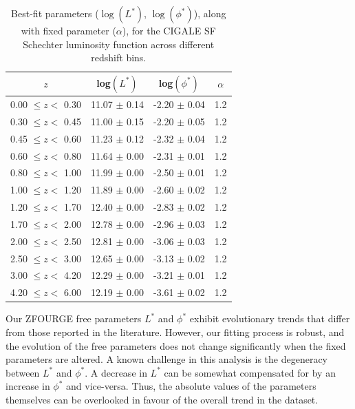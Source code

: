 \begin{table}[h]
    \caption{Best-fit parameters ($\log(L^*)$, $\log(\phi^*)$), along with fixed parameter ($\alpha$), for the CIGALE SF Schechter luminosity function across different redshift bins.}
    \label{Tab: Param Evo SF}
    \begin{center}
    \begin{tabular}{cccc}
        \toprule
        $z$ & log$(L^{*})$ & log$(\phi^{*})$ & $\alpha$ \\
        \hline
        0.00 $\leq z <$ 0.30 & 11.07 $\pm$ 0.14 & -2.20 $\pm$ 0.04 & 1.2 \\
        0.30 $\leq z <$ 0.45 & 11.00 $\pm$ 0.15 & -2.20 $\pm$ 0.05 & 1.2 \\
        0.45 $\leq z <$ 0.60 & 11.23 $\pm$ 0.12 & -2.32 $\pm$ 0.04 & 1.2 \\
        0.60 $\leq z <$ 0.80 & 11.64 $\pm$ 0.00 & -2.31 $\pm$ 0.01 & 1.2 \\
        0.80 $\leq z <$ 1.00 & 11.99 $\pm$ 0.00 & -2.50 $\pm$ 0.01 & 1.2 \\
        1.00 $\leq z <$ 1.20 & 11.89 $\pm$ 0.00 & -2.60 $\pm$ 0.02 & 1.2 \\
        1.20 $\leq z <$ 1.70 & 12.40 $\pm$ 0.00 & -2.83 $\pm$ 0.02 & 1.2 \\
        1.70 $\leq z <$ 2.00 & 12.78 $\pm$ 0.00 & -2.96 $\pm$ 0.03 & 1.2 \\
        2.00 $\leq z <$ 2.50 & 12.81 $\pm$ 0.00 & -3.06 $\pm$ 0.03 & 1.2 \\
        2.50 $\leq z <$ 3.00 & 12.65 $\pm$ 0.00 & -3.13 $\pm$ 0.02 & 1.2 \\
        3.00 $\leq z <$ 4.20 & 12.29 $\pm$ 0.00 & -3.21 $\pm$ 0.01 & 1.2 \\
        4.20 $\leq z <$ 6.00 & 12.19 $\pm$ 0.00 & -3.61 $\pm$ 0.02 & 1.2      
        \botrule
    \end{tabular}
    \end{center}
\end{table}

Our ZFOURGE free parameters $L^{*}$ and $\phi^{*}$ exhibit evolutionary trends that differ from those reported in the literature. However, our fitting process is robust, and the evolution of the free parameters does not change significantly when the fixed parameters are altered. A known challenge in this analysis is the degeneracy between $L^{*}$ and $\phi^{*}$. A decrease in $L^{*}$ can be somewhat compensated for by an increase in $\phi^{*}$ and vice-versa. Thus, the absolute values of the parameters themselves can be overlooked in favour of the overall trend in the dataset. 

